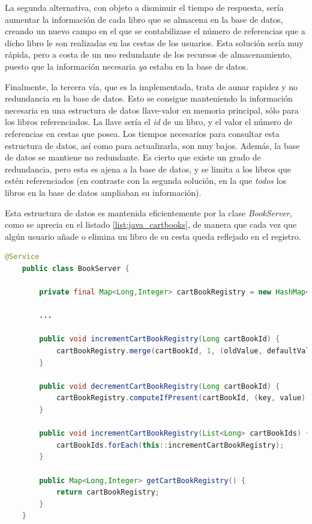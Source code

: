 \documentclass[a4paper]{article}
\begin{document}
    La segunda alternativa, con objeto a disminuir el tiempo de respuesta, sería aumentar la información de cada libro que se almacena en la base de datos, creando un nuevo campo en el que se contabilizase el número de referencias que a dicho libro le son realizadas en las cestas de los usuarios. Esta solución sería muy rápida, pero a costa de un uso redundante de los recursos de almacenamiento, puesto que la información necesaria \emph{ya} estaba en la base de datos.
    
    Finalmente, la tercera vía, que es la implementada, trata de aunar rapidez y no redundancia en la base de datos. Esto se consigue manteniendo la información necesaria en una estructura de datos llave-valor en memoria principal, sólo para los libros referenciados. La llave sería el \emph{id} de un libro, y el valor el número de referencias en cestas que posea. Los tiempos necesarios para consultar esta estructura de datos, así como para actualizarla, son muy bajos. Además, la base de datos se mantiene no redundante. Es cierto que existe un grado de redundancia, pero esta es ajena a la base de datos, y se limita a los libros que estén referenciados (en contraste con la segunda solución, en la que \emph{todos} los libros en la base de datos ampliaban su información).
    
    Esta estructura de datos es mantenida eficientemente por la clase \emph{BookServer}, como se aprecia en el listado \ref{list:java_cartbooks}, de manera que cada vez que algún usuario añade o elimina un libro de su cesta queda reflejado en el registro.
    \\
    
    \begin{lstlisting}[language=Java,caption=Gestión del registro de libros referenciados en cestas,label=list:java_cartbooks]
    @Service
    public class BookServer {
    
    	private final Map<Long,Integer> cartBookRegistry = new HashMap<>();
    	
    	...
    	
	    public void incrementCartBookRegistry(Long cartBookId) {
		    cartBookRegistry.merge(cartBookId, 1, (oldValue, defaultValue) -> ++oldValue);
	    }
	    
	    public void decrementCartBookRegistry(Long cartBookId) {
		    cartBookRegistry.computeIfPresent(cartBookId, (key, value) -> (value > 1L) ? --value : null);
	    }
	    
	    public void incrementCartBookRegistry(List<Long> cartBookIds) {
	    	cartBookIds.forEach(this::incrementCartBookRegistry);
	    }
	    
	    public Map<Long,Integer> getCartBookRegistry() {
	    	return cartBookRegistry;
	    }
    }
    \end{lstlisting}
    
\end{document}
